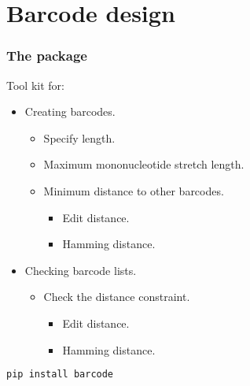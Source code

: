 \documentclass[slidestop]{beamer}
\begin{document}
\section{Barcode design}
\begin{frame}[fragile]
  \frametitle{The  package}

  Tool kit for:
  \begin{itemize}
    \item Creating barcodes.
    \begin{itemize}
      \item Specify length.
      \item Maximum mononucleotide stretch length.
      \item Minimum distance to other barcodes.
      \begin{itemize}
        \item Edit distance.
        \item Hamming distance.
      \end{itemize}
    \end{itemize}
    \pause
    \item Checking barcode lists.
    \begin{itemize}
      \item Check the distance constraint.
      \begin{itemize}
        \item Edit distance.
        \item Hamming distance.
      \end{itemize}
    \end{itemize}
  \end{itemize}
  \bigskip
  \pause

  \begin{lstlisting}[language=bash]
    pip install barcode
  \end{lstlisting}
\end{frame}
\end{document}
